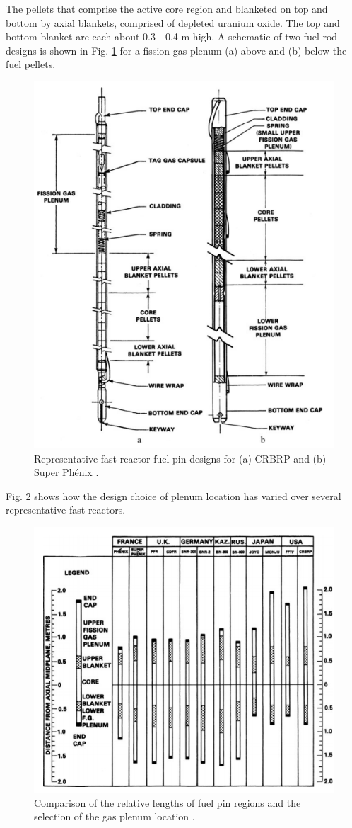 \documentclass[10pt]{article}
\numberwithin{equation}{section} %
\begin{document}
The pellets that comprise the active core region and blanketed on top and bottom by axial blankets, comprised of depleted uranium oxide. The top and bottom blanket are each about 0.3 - 0.4 m high. A schematic of two fuel rod designs is shown in Fig. \ref{fig:FastReactorPins} for a fission gas plenum (a) above and (b) below the fuel pellets. 

\begin{figure}[H]
\centering
\includegraphics[width=0.6\linewidth]{figures/FastReactorPins.pdf}
\caption{Representative fast reactor fuel pin designs for (a) CRBRP and (b) Super Ph\'{e}nix \cite{FastReactors}.}
\label{fig:FastReactorPins}
\end{figure}

Fig. \ref{fig:FastReactorPlenumChoices} shows how the design choice of plenum location has varied over several representative fast reactors.

\begin{figure}[H]
\centering
\includegraphics[width=0.6\linewidth]{figures/FastReactorPlenumChoices.pdf}
\caption{Comparison of the relative lengths of fuel pin regions and the selection of the gas plenum location \cite{FastReactors}.}
\label{fig:FastReactorPlenumChoices}
\end{figure}
\end{document}
